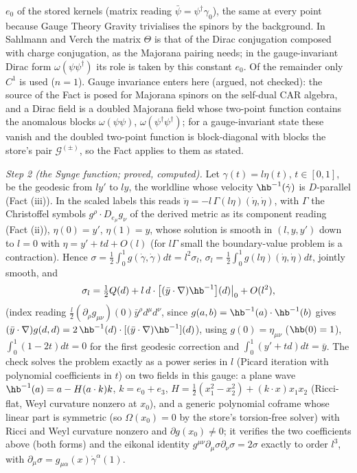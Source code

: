 $e_{0}$ of the stored kernels (matrix reading $\bar\psi = \psi^{\dagger}\gamma_{0}$), the same at every point because Gauge Theory Gravity trivialises the spinors by the background. In Sahlmann and Verch the matrix $\Theta$ is that of the Dirac conjugation composed with charge conjugation, as the Majorana pairing needs; in the gauge-invariant Dirac form $\omega(\psi\psi^{\dagger})$ its role is taken by this constant $e_{0}$. Of the remainder only $C^{1}$ is used ($n = 1$). Gauge invariance enters here (argued, not checked): the source of the Fact is posed for Majorana spinors on the self-dual CAR algebra, and a Dirac field is a doubled Majorana field whose two-point function contains the anomalous blocks $\omega(\psi\psi)$, $\omega(\psi^{\dagger}\psi^{\dagger})$; for a gauge-invariant state these vanish and the doubled two-point function is block-diagonal with blocks the store's pair $\mathcal{G}^{(\pm)}$, so the Fact applies to them as stated.

\emph{Step 2 (the Synge function; proved, computed).} Let $\gamma(t) = l\eta(t)$, $t \in [0, 1]$, be the geodesic from $ly'$ to $ly$, the worldline whose velocity $\hb^{-1}(\dot\gamma)$ is $D$-parallel (Fact (iii)). In the scaled labels this reads $\ddot\eta = -l\,\Gamma(l\eta)(\dot\eta, \dot\eta)$, with $\Gamma$ the Christoffel symbols $g^{\rho}\cdot D_{e_{\mu}}g_{\nu}$ of the derived metric as its component reading (Fact (ii)), $\eta(0) = y'$, $\eta(1) = y$, whose solution is smooth in $(l, y, y')$ down to $l = 0$ with $\eta = y' + td + O(l)$ (for $l\Gamma$ small the boundary-value problem is a contraction). Hence $\sigma = \tfrac12\int_{0}^{1}g(\dot\gamma, \dot\gamma)dt = l^{2}\sigma_{l}$, $\sigma_{l} = \tfrac12\int_{0}^{1}g(l\eta)(\dot\eta, \dot\eta)dt$, jointly smooth, and
\[
\sigma_{l} = \tfrac12 Q(d) + l\,d\cdot\bigl[(\bar y\cdot\nabla)\hb^{-1}\bigr](d)\big|_{0} + O(l^{2}),
\]
(index reading $\tfrac{l}{2}(\partial_{\rho}g_{\mu\nu})(0)\bar y^{\rho}d^{\mu}d^{\nu}$, since $g(a, b) = \hb^{-1}(a)\cdot\hb^{-1}(b)$ gives $(\bar y\cdot\nabla)g(d, d) = 2\,\hb^{-1}(d)\cdot[(\bar y\cdot\nabla)\hb^{-1}](d)$), using $g(0) = \eta_{\mu\nu}$ ($\hb(0) = 1$), $\int_{0}^{1}(1 - 2t)dt = 0$ for the first geodesic correction and $\int_{0}^{1}(y' + td)dt = \bar y$. The check solves the problem exactly as a power series in $l$ (Picard iteration with polynomial coefficients in $t$) on two fields in this gauge: a plane wave $\hb^{-1}(a) = a - H(a\cdot k)k$, $k = e_{0} + e_{3}$, $H = \tfrac12(x_{1}^{2} - x_{2}^{2}) + (k\cdot x)x_{1}x_{2}$ (Ricci-flat, Weyl curvature nonzero at $x_{0}$), and a generic polynomial coframe whose linear part is symmetric (so $\Omega(x_{0}) = 0$ by the store's torsion-free solver) with Ricci and Weyl curvature nonzero and $\partial g(x_{0}) \ne 0$; it verifies the two coefficients above (both forms) and the eikonal identity $g^{\mu\nu}\partial_{\mu}\sigma\partial_{\nu}\sigma = 2\sigma$ exactly to order $l^{3}$, with $\partial_{\mu}\sigma = g_{\mu\alpha}(x)\dot\gamma^{\alpha}(1)$.

